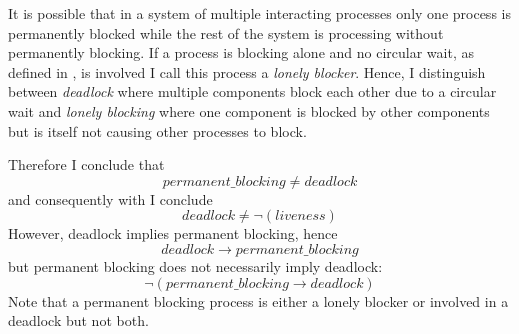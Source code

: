 It is possible that in a system of multiple interacting processes only one process is permanently blocked while the rest of the system is processing without permanently blocking.
If a process is blocking alone and no circular wait, as defined in , is involved I call this process a \emph{lonely blocker}.
Hence, I distinguish between \emph{deadlock} where multiple components block each other due to a circular wait and \emph{lonely blocking} where one component is blocked by other components but is itself not causing other processes to block.

Therefore I conclude that
\begin{displaymath}
    permanent\_blocking \neq deadlock
\end{displaymath}
and consequently with \Equ{\ref{eq_liveness}} I conclude
\begin{displaymath}
    deadlock \neq \neg(liveness)
\end{displaymath}
However, deadlock implies permanent blocking, hence
\begin{displaymath}
    deadlock \rightarrow permanent\_blocking
\end{displaymath}
but permanent blocking does not necessarily imply deadlock:
\begin{displaymath}
    \neg(permanent\_blocking \rightarrow deadlock)
\end{displaymath}
Note that a permanent blocking process is either a lonely blocker or involved in a deadlock but not both.

